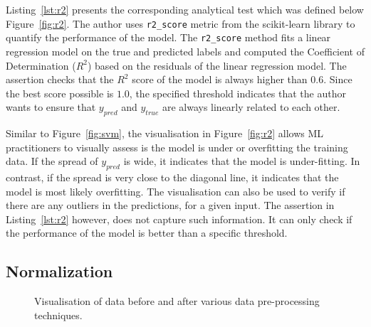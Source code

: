 \documentclass[conference]{IEEEtran}
\begin{document}
Listing~\ref{lst:r2} presents the corresponding analytical test which was defined below Figure~\ref{fig:r2}. The author uses \texttt{r2\_score} metric from the scikit-learn library to quantify the performance of the model. The \texttt{r2\_score} method fits a linear regression model on the true and predicted labels and computed the Coefficient of Determination ($R^2$) based on the residuals of the linear regression model. The assertion checks that the $R^2$ score of the model is always higher than $0.6$. Since the best score possible is $1.0$, the specified threshold indicates that the author wants to ensure that $y_{pred}$ and $y_{true}$ are always linearly related to each other.

Similar to Figure~\ref{fig:svm}, the visualisation in Figure~\ref{fig:r2} allows ML practitioners to visually assess is the model is under or overfitting the training data. If the spread of $y_{pred}$ is wide, it indicates that the model is under-fitting. In contrast, if the spread is very close to the diagonal line, it indicates that the model is most likely overfitting. The visualisation can also be used to verify if there are any outliers in the predictions, for a given input. The assertion in Listing~\ref{lst:r2} however, does not capture such information. It can only check if the performance of the model is better than a specific threshold.

\subsection{Normalization}


\begin{figure}
  \hfill
  \caption{Visualisation of data before and after various data pre-processing techniques.}
  \label{fig:data-pre-process}
\end{figure}
\end{document}

